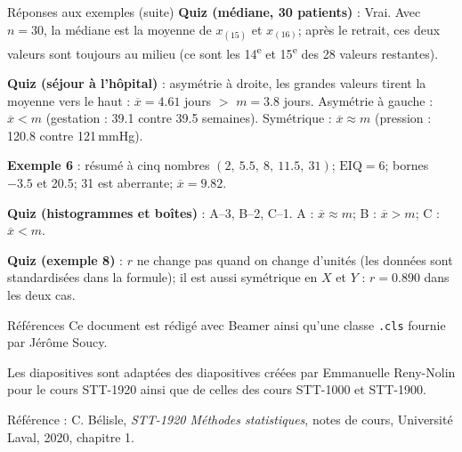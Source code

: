 \documentclass{BeamerTemplate}
\begin{document}
\begin{frame}[t]{Réponses aux exemples (suite)}
  \footnotesize
  \textbf{Quiz (médiane, 30 patients)} : Vrai. Avec $n = 30$, la médiane est
  la moyenne de $x_{(15)}$ et $x_{(16)}$; après le retrait, ces deux valeurs
  sont toujours au milieu (ce sont les 14\textsuperscript{e} et
  15\textsuperscript{e} des 28 valeurs restantes).

  \medskip
  \textbf{Quiz (séjour à l'hôpital)} : asymétrie à droite, les grandes
  valeurs tirent la moyenne vers le haut : $\overline{x} = 4.61$ jours
  $>$ $m = 3.8$ jours. Asymétrie à gauche : $\overline{x} < m$ (gestation :
  39.1 contre 39.5 semaines). Symétrique : $\overline{x} \approx m$
  (pression : 120.8 contre 121\,mmHg).

  \medskip
  \textbf{Exemple 6} : résumé à cinq nombres $(2,\ 5.5,\ 8,\ 11.5,\ 31)$;
  $\text{EIQ} = 6$; bornes $-3.5$ et 20.5; 31 est aberrante;
  $\overline{x} = 9.82$.

  \medskip
  \textbf{Quiz (histogrammes et boîtes)} : A--3, B--2, C--1.
  A : $\overline{x} \approx m$; B : $\overline{x} > m$; C : $\overline{x} < m$.

  \medskip
  \textbf{Quiz (exemple 8)} : $r$ ne change pas quand on change d'unités
  (les données sont standardisées dans la formule); il est aussi symétrique
  en $X$ et $Y$ : $r = 0.890$ dans les deux cas.
\end{frame}

\begin{frame}[t]{Références}
  Ce document est rédigé avec Beamer ainsi qu'une classe \texttt{.cls} fournie
  par Jérôme Soucy.

  \medskip
  Les diapositives sont adaptées des diapositives créées par Emmanuelle
  Reny-Nolin pour le cours STT-1920 ainsi que de celles des cours STT-1000 et
  STT-1900.

  \medskip
  Référence : C. Bélisle, \emph{STT-1920 Méthodes statistiques}, notes de
  cours, Université Laval, 2020, chapitre 1.
\end{frame}
\end{document}
